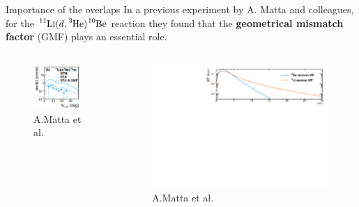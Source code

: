 \documentclass[aspectratio=43]{beamer}
\newcommand{\iso}[2]{\ce{^{#1}#2}}
\begin{document}
\begin{frame}[t]{Importance of the overlaps}
    In a previous experiment by A. Matta and colleagues, for the $\iso{11}{Li}(d, \iso{3}{He})\iso{10}{Be}$ reaction they found that the \textbf{geometrical mismatch factor} (GMF) plays an essential role.
    \begin{columns}[T]
        {
            \begin{figure}
                \includegraphics[width=0.9\linewidth]{figures/matta_11Li_d3He.png}
                \caption{A.Matta et al.}
            \end{figure}
        }
        {
            \begin{figure}
                \includegraphics[width=1\linewidth]{figures/wf_12Be.pdf}
                \caption{A.Matta et al.}
            \end{figure}
        }
    \end{columns}

\end{frame}
\end{document}
